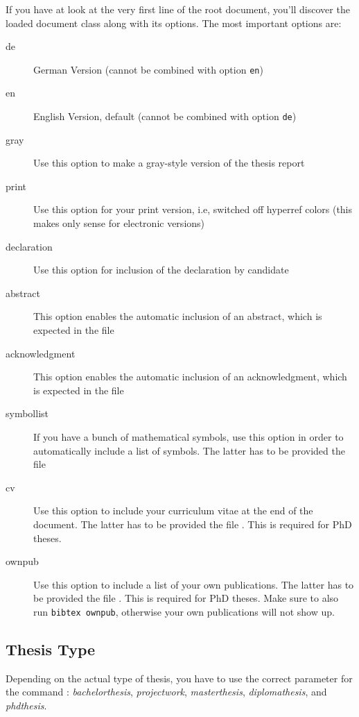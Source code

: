 If you have at look at the very first line of the root document, you'll discover the loaded document class along with its options. The most important options are:
\begin{description}
  \item[de] German Version (cannot be combined with option \texttt{en})
  \item[en] English Version, default (cannot be combined with option \texttt{de})
  \item[gray] Use this option to make a gray-style version of the thesis report
  \item[print] Use this option for your print version, i.e, switched off hyperref colors (this makes only sense for electronic versions)
  \item[declaration] Use this option for inclusion of the declaration by candidate
  \item[abstract] This option enables the automatic inclusion of an abstract, which is expected in the file 
  \item[acknowledgment] This option enables the automatic inclusion of an acknowledgment, which is expected in the file 
  \item[symbollist] If you have a bunch of mathematical symbols, use this option in order to automatically include a list of symbols. The latter has to be provided the file 
  \item[cv] Use this option to include your curriculum vitae at the end of the document. The latter has to be provided the file . This is required for PhD theses.
  \item[ownpub] Use this option to include a list of your own publications. The latter has to be provided the file . This is required for PhD theses. Make sure to also run \texttt{bibtex ownpub}, otherwise your own publications will not show up.
\end{description}


\subsection{Thesis Type}

Depending on the actual type of thesis, you have to use the correct parameter for the command : \emph{bachelorthesis}, \emph{projectwork}, \emph{masterthesis}, \emph{diplomathesis}, and \emph{phdthesis}.


